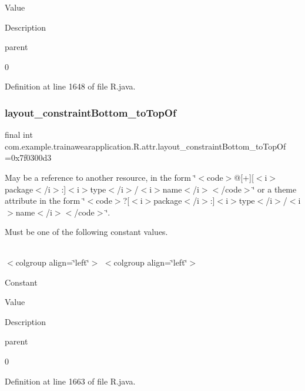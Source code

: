 Value

Description 

parent

0

Definition at line 1648 of file R.\+java.

\mbox{\label{classcom_1_1example_1_1trainawearapplication_1_1_r_1_1attr_a72f8694d56ba40f8e2b1dddc99f3b677}} 
\subsubsection{\texorpdfstring{layout\_constraintBottom\_toTopOf}{layout\_constraintBottom\_toTopOf}}
{\footnotesize\ttfamily final int com.\+example.\+trainawearapplication.\+R.\+attr.\+layout\+\_\+constraint\+Bottom\+\_\+to\+Top\+Of =0x7f0300d3\hspace{0.3cm}{\ttfamily [static]}}

May be a reference to another resource, in the form \char`\"{}$<$code$>$@\mbox{[}+\mbox{]}\mbox{[}$<$i$>$package$<$/i$>$\+:\mbox{]}$<$i$>$type$<$/i$>$/$<$i$>$name$<$/i$>$$<$/code$>$\char`\"{} or a theme attribute in the form \char`\"{}$<$code$>$?\mbox{[}$<$i$>$package$<$/i$>$\+:\mbox{]}$<$i$>$type$<$/i$>$/$<$i$>$name$<$/i$>$$<$/code$>$\char`\"{}. 

Must be one of the following constant values.

\tabulinesep=1mm
\begin{longtabu}spread 0pt [c]{*{0}{|X[-1]}|}
\hline
\end{longtabu}
$<$colgroup align=\char`\"{}left\char`\"{}$>$ $<$colgroup align=\char`\"{}left\char`\"{}$>$ 

Constant

Value

Description 

parent

0

Definition at line 1663 of file R.\+java.

\mbox{\label{classcom_1_1example_1_1trainawearapplication_1_1_r_1_1attr_a2d0fc0da56776452dd131901500e1063}} 
